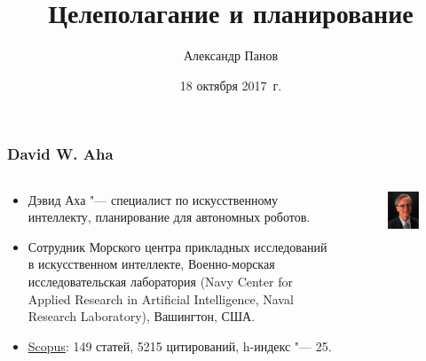 \documentclass[default]{beamer}
\begin{document}
	
	\title[Cognitome]{Целеполагание и планирование}
	\author[Панов]{Александр Панов}
	\date{18 октября 2017~г.} 
	
	\begin{frame}
		\titlepage
	\end{frame}
		
	\begin{frame}
		\frametitle{David W. Aha}
		
		\footnotesize
		\begin{columns}
			\begin{column}{0.8\textwidth}
				\begin{itemize}
					\item Дэвид Аха "--- специалист по искусственному интеллекту, планирование для автономных роботов.
					\item Сотрудник Морского центра прикладных исследований в искусственном интеллекте, Военно-морская исследовательская лаборатория (Navy Center for Applied Research in Artificial Intelligence, Naval Research Laboratory), Вашингтон, США.
					\item \href{https://www.scopus.com/authid/detail.uri?authorId=6701853513}{Scopus}: 149 статей, 5215 цитирований, h-индекс "--- 25.
				\end{itemize}
			\end{column}
			\begin{column}{0.2\textwidth}
				\begin{figure}
					\includegraphics[width=\textwidth]{dwa.jpg}

\end{figure}
\end{column}
\end{columns}
\end{frame}
\end{document}
